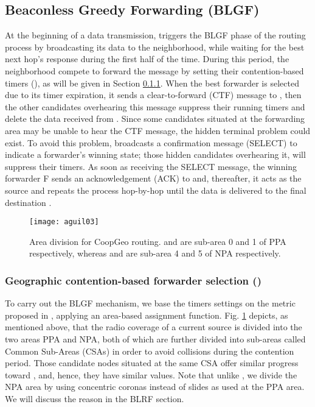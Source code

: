 \documentclass[journal,twoside,final]{IEEEtran}
\begin{document}
\subsection{Beaconless Greedy Forwarding (BLGF)}\label{Greedy}
At the beginning of a data transmission,  triggers the BLGF phase of the routing process by broadcasting its data to the neighborhood, while waiting for the best next hop's response during the first half of the  time. During this period, the neighborhood compete to forward the message by setting their contention-based timers (), as will be given in Section \ref{CBF}. When the best forwarder is selected due to its timer expiration, it sends a clear-to-forward (CTF) message to , then the other candidates overhearing this message suppress their running timers and delete the data received from . Since some candidates situated at the forwarding area may be unable to hear the CTF message, the hidden terminal problem could exist. To avoid this problem,  broadcasts a confirmation message (SELECT) to indicate a forwarder's winning state; those hidden candidates overhearing it, will suppress their timers. As soon as receiving the SELECT message, the winning forwarder F sends an acknowledgement (ACK) to  and, thereafter, it acts as the source and repeats the process hop-by-hop until the data is delivered to the final destination .

\begin{figure}[t]
  \centering
  \texttt{[image: aguil03]}      \caption{Area division for CoopGeo routing.  and  are sub-area 0 and 1 of PPA respectively, whereas  and  are sub-area 4 and 5 of NPA respectively.
  }\label{fig:areas}
\end{figure}

\subsubsection{Geographic contention-based forwarder selection ()}\label{CBF}
To carry out the BLGF mechanism, we base the timers settings on the metric proposed in \cite{Sanchez2007}, applying an area-based assignment function. Fig. \ref{fig:areas} depicts, as mentioned above, that the radio coverage of a current source is divided into the two areas PPA and NPA, both of which are further divided into sub-areas called Common Sub-Areas (CSAs) in order to avoid collisions during the contention period. Those candidate nodes situated at the same CSA offer similar progress toward , and, hence, they have similar  values. Note that unlike \cite{Sanchez2007}, we divide the NPA area by using concentric coronas instead of slides as used at the PPA area. We will discuss the reason in the BLRF section.
\end{document}
